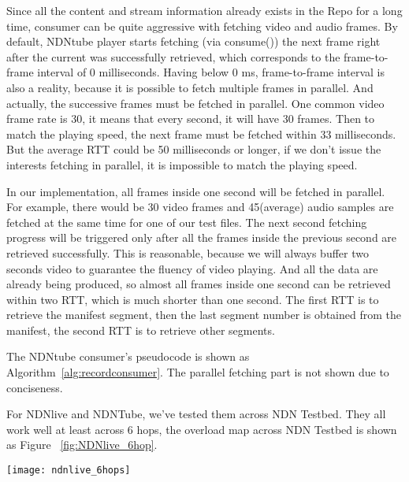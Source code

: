 Since all the content and stream information already exists in the Repo for a long time, consumer can be quite aggressive with fetching video and audio frames. By default, NDNtube player starts fetching (via consume()) the next frame right after the current was successfully retrieved, which corresponds to the frame-to-frame interval of 0 milliseconds. Having below 0 ms, frame-to-frame interval is also a reality, because it is possible to fetch multiple frames in parallel. And actually, the successive frames must be fetched in parallel. One common video frame rate is 30, it means that every second, it will have 30 frames. Then to match the playing speed, the next frame must be fetched within 33 milliseconds. But the average RTT could be 50 milliseconds or longer, if we don't issue the interests fetching in parallel, it is impossible to match the playing speed.

In our implementation, all frames inside one second will be fetched in parallel. For example, there would be 30 video frames and 45(average) audio samples are fetched at the same time for one of our test files. The next second fetching progress will be triggered only after all the frames inside the previous second are retrieved successfully. This is reasonable, because we will always buffer two seconds video to guarantee the fluency of video playing. And all the data are already being produced, so almost all frames inside one second can be retrieved within two RTT, which is much shorter than one second. The first RTT is to retrieve the manifest segment, then the last segment number is obtained from the manifest, the second RTT is to retrieve other segments. 

The NDNtube consumer's pseudocode is shown as Algorithm~\ref{alg:recordconsumer}. The parallel fetching part is not shown due to conciseness.

For NDNlive and NDNTube, we've tested them across NDN Testbed. They all work well at least across 6 hops, the overload map across NDN Testbed is shown as Figure ~\ref{fig:NDNlive_6hop}.

\begin{figure*}[ht]
  \centering
  \texttt{[image: ndnlive\_6hops]}
  \caption{Overload Map over NDN Testbed}
  \label{fig:NDNlive_6hop}
\end{figure*}

